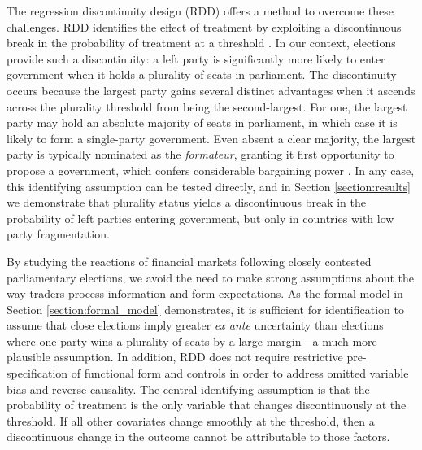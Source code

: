 \documentclass[12pt]{article}
\begin{document}
The regression discontinuity design (RDD) offers a method to overcome these challenges. RDD identifies the effect of treatment by exploiting a discontinuous break in the probability of treatment at a threshold \citep{Hahn2001, Imbens2008, Calonico2014}. In our context, elections provide such a discontinuity: a left party is significantly more likely to enter government when it holds a plurality of seats in parliament. The discontinuity occurs because the largest party gains several distinct advantages when it ascends across the plurality threshold from being the second-largest. For one, the largest party may hold an absolute majority of seats in parliament, in which case it is likely to form a single-party government. Even absent a clear majority, the largest party is typically nominated as the \textit{formateur}, granting it first opportunity to propose a government, which confers considerable bargaining power \citep{Baron1989}. In any case, this identifying assumption can be tested directly, and in Section \ref{section:results} we demonstrate that plurality status yields a discontinuous break in the probability of left parties entering government, but only in countries with low party fragmentation. 


By studying the reactions of financial markets following closely contested parliamentary elections, we avoid the need to make strong assumptions about the way traders process information and form expectations. As the formal model in Section \ref{section:formal_model} demonstrates, it is sufficient for identification to assume that close elections imply greater \textit{ex ante} uncertainty than elections where one party wins a plurality of seats by a large margin---a much more plausible assumption. In addition, RDD does not require restrictive pre-specification of functional form and controls in order to address omitted variable bias and reverse causality. The central identifying assumption is that the probability of treatment is the only variable that changes discontinuously at the threshold. If all other covariates change smoothly at the threshold, then a discontinuous change in the outcome cannot be attributable to those factors. 
\end{document}
